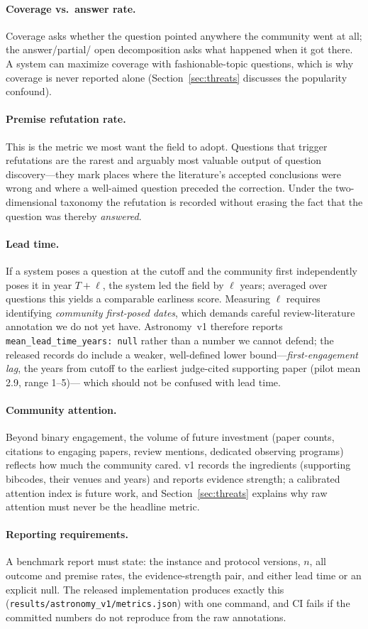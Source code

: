 \paragraph{Coverage vs.\ answer rate.} Coverage asks whether the
question pointed anywhere the community went at all; the answer/partial/
open decomposition asks what happened when it got there. A system can
maximize coverage with fashionable-topic questions, which is why
coverage is never reported alone (Section~\ref{sec:threats} discusses
the popularity confound).

\paragraph{Premise refutation rate.} This is the metric we most want the
field to adopt. Questions that trigger refutations are the rarest and
arguably most valuable output of question discovery---they mark places
where the literature's accepted conclusions were wrong and where a
well-aimed question preceded the correction. Under the two-dimensional
taxonomy the refutation is recorded without erasing the fact that the
question was thereby \emph{answered}.

\paragraph{Lead time.} If a system poses a question at the cutoff and
the community first independently poses it in year $T{+}\ell$, the
system led the field by $\ell$ years; averaged over questions this
yields a comparable earliness score. Measuring $\ell$ requires
identifying \emph{community first-posed dates}, which demands careful
review-literature annotation we do not yet have. Astronomy~v1 therefore
reports \texttt{mean\_lead\_time\_years:\,null} rather than a number we
cannot defend; the released records do include a weaker, well-defined
lower bound---\emph{first-engagement lag}, the years from cutoff to the
earliest judge-cited supporting paper (pilot mean 2.9, range 1--5)---
which should not be confused with lead time.

\paragraph{Community attention.} Beyond binary engagement, the volume of
future investment (paper counts, citations to engaging papers, review
mentions, dedicated observing programs) reflects how much the community
cared. v1 records the ingredients (supporting bibcodes, their venues and
years) and reports evidence strength; a calibrated attention index is
future work, and Section~\ref{sec:threats} explains why raw attention
must never be the headline metric.

\paragraph{Reporting requirements.} A benchmark report must state: the
instance and protocol versions, $n$, all outcome and premise rates, the
evidence-strength pair, and either lead time or an explicit null. The
released implementation produces exactly this
(\texttt{results/astronomy\_v1/metrics.json}) with one command, and CI
fails if the committed numbers do not reproduce from the raw
annotations.
